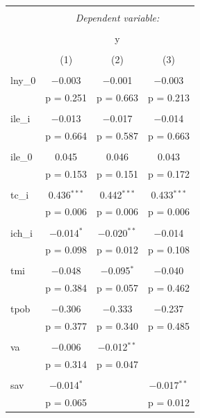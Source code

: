 \begin{table}[!htbp] \centering 
    \tiny
  \caption{} 
  \label{} 
\begin{tabular}{@{\extracolsep{5pt}}lccc} 
\\[-1.8ex]\hline 
\hline \\[-1.8ex] 
 & \multicolumn{3}{c}{\textit{Dependent variable:}} \\ 
\cline{2-4} 
\\[-1.8ex] & \multicolumn{3}{c}{y} \\ 
\\[-1.8ex] & (1) & (2) & (3)\\ 
\hline \\[-1.8ex] 
 lny\_0 & $-$0.003 & $-$0.001 & $-$0.003 \\ 
  & p = 0.251 & p = 0.663 & p = 0.213 \\ 
  & & & \\ 
 ile\_i & $-$0.013 & $-$0.017 & $-$0.014 \\ 
  & p = 0.664 & p = 0.587 & p = 0.663 \\ 
  & & & \\ 
 ile\_0 & 0.045 & 0.046 & 0.043 \\ 
  & p = 0.153 & p = 0.151 & p = 0.172 \\ 
  & & & \\ 
 tc\_i & 0.436$^{***}$ & 0.442$^{***}$ & 0.433$^{***}$ \\ 
  & p = 0.006 & p = 0.006 & p = 0.006 \\ 
  & & & \\ 
 ich\_i & $-$0.014$^{*}$ & $-$0.020$^{**}$ & $-$0.014 \\ 
  & p = 0.098 & p = 0.012 & p = 0.108 \\ 
  & & & \\ 
 tmi & $-$0.048 & $-$0.095$^{*}$ & $-$0.040 \\ 
  & p = 0.384 & p = 0.057 & p = 0.462 \\ 
  & & & \\ 
 tpob & $-$0.306 & $-$0.333 & $-$0.237 \\ 
  & p = 0.377 & p = 0.340 & p = 0.485 \\ 
  & & & \\ 
 va & $-$0.006 & $-$0.012$^{**}$ &  \\ 
  & p = 0.314 & p = 0.047 &  \\ 
  & & & \\ 
 sav & $-$0.014$^{*}$ &  & $-$0.017$^{**}$ \\ 
  & p = 0.065 &  & p = 0.012 \\ 

\end{tabular}
\end{table}
